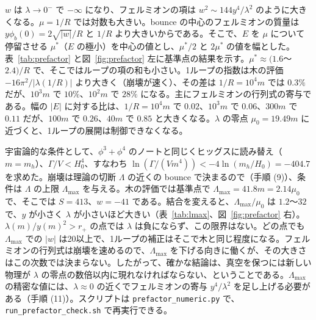 \documentclass[a4paper,10pt]{ltjsarticle}
\begin{document}
$w$ は $\lambda\to0^-$ で $-\infty$ になり、フェルミオンの項は $w^2\sim144y^4/\lambda^2$ のように大きくなる。$\mu=1/R$ では対数も大きい。bounce の中心のフェルミオンの質量は $y\phi_b(0)=2\sqrt{|w|}/R$ と $1/R$ より大きいからである。そこで、$E$ を $\mu$ について停留させる $\mu^*$（$E$ の極小）を中心の値とし、$\mu^*/2$ と $2\mu^*$ の値を幅とした。表~\ref{tab:prefactor} と図~\ref{fig:prefactor} 左に基準点の結果を示す。$\mu^*\approx(1.6$〜$2.4)/R$ で、そこではループの項の和も小さい。1ループの指数は木の評価 $-16\pi^2/|\lambda(1/R)|$ より大きく（崩壊が速く）、その差は $1/R=10^4m$ では $0.3\%$ だが、$10^3m$ で $10\%$、$10^2m$ で $28\%$ になる。主にフェルミオンの行列式の寄与である。幅の $|E|$ に対する比は、$1/R=10^4m$ で $0.02$、$10^3m$ で $0.06$、$300m$ で $0.11$ だが、$100m$ で $0.26$、$40m$ で $0.85$ と大きくなる。$\lambda$ の零点 $\mu_0=19.49m$ に近づくと、1ループの展開は制御できなくなる。

宇宙論的な条件として、$\phi^3+\phi^4$ のノートと同じくヒッグスに読み替え（$m=m_h$）、$\Gamma/V<H_0^4$、すなわち $\ln(\Gamma/(Vm^4))<-4\ln(m_h/H_0)=-404.7$ を求めた。崩壊は理論の切断 $\Lambda$ の近くの bounce で決まるので（手順 (9)）、条件は $\Lambda$ の上限 $\Lambda_{\max}$ を与える。木の評価では基準点で $\Lambda_{\max}=41.8m=2.14\mu_0$ で、そこでは $S=413$、$w=-41$ である。結合を変えると、$\Lambda_{\max}/\mu_0$ は $1.2$〜$32$ で、$y$ が小さく $\lambda$ が小さいほど大きい（表~\ref{tab:lmax}、図~\ref{fig:prefactor} 右）。$\lambda(m)/y(m)^2>r_+$ の点では $\lambda$ は負にならず、この限界はない。どの点でも $\Lambda_{\max}$ での $|w|$ は20以上で、1ループの補正はそこで木と同じ程度になる。フェルミオンの行列式は崩壊を速めるので、$\Lambda_{\max}$ を下げる向きに働くが、その大きさはこの次数では決まらない。したがって、確かな結論は、真空を保つには新しい物理が $\lambda$ の零点の数倍以内に現れなければならない、ということである。$\Lambda_{\max}$ の精密な値には、$\lambda\approx0$ の近くでフェルミオンの寄与 $y^4/\lambda^2$ を足し上げる必要がある（手順 (11)）。スクリプトは \texttt{prefactor\_numeric.py} で、\texttt{run\_prefactor\_check.sh} で再実行できる。
\end{document}
